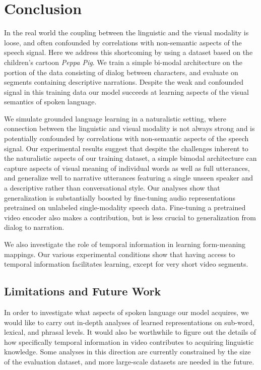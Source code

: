 \section{Conclusion}
\label{sec:conclusion}
In the real world
  the coupling between the linguistic and the visual modality is
  loose, and often confounded by correlations with non-semantic
  aspects of the speech signal. Here we address this shortcoming by
  using a dataset based on the children's cartoon {\it Peppa Pig}.  We
  train a simple bi-modal architecture on the portion of the data
  consisting of dialog between characters, and evaluate on segments
  containing descriptive narrations. Despite the weak and confounded
  signal in this training data our model succeeds at learning aspects
  of the visual semantics of spoken language.
  
We simulate grounded language learning in a naturalistic setting, where 
connection between the linguistic and visual modality is not always strong 
and is potentially confounded by correlations with non-semantic aspects of 
the speech signal. Our experimental results suggest that despite the 
challenges inherent to the naturalistic aspects of our training dataset, a 
simple bimodal architecture can capture aspects of visual meaning of individual 
words as well as full utterances, and generalize well to narrative utterances
featuring a single unseen speaker and a descriptive rather than
conversational style. Our analyses show that generalization is substantially
boosted by fine-tuning audio representations pretrained on unlabeled
single-modality speech data. Fine-tuning a pretrained video encoder
also makes a contribution, but is less crucial to generalization from
dialog to narration.

We also investigate the role of temporal information in learning form-meaning 
mappings. Our various experimental conditions show that having access to 
temporal information facilitates learning, except for very short video segments.

\subsection{Limitations and Future Work}
\label{sec:limitations}

In order to investigate what aspects of spoken language our model
acquires, we would like to carry out in-depth analyses of learned
representations on sub-word, lexical, and phrasal levels. It would
also be worthwhile to figure out the details of how specifically
temporal information in video contributes to acquiring linguistic
knowledge.  Some analyses in this direction are currently constrained
by the size of the evaluation dataset, and more large-scale datasets
are needed in the future.

